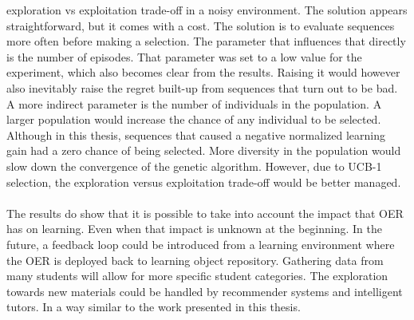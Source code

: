 exploration vs exploitation trade-off in a noisy environment. The solution
appears straightforward, but it comes with a cost. The solution is to evaluate
sequences more often before making a selection. The parameter that influences
that directly is the number of episodes. That parameter was set to a low value
for the experiment, which also becomes clear from the results. Raising it would
however also inevitably raise the regret built-up from sequences that turn out
to be bad. A more indirect parameter is the number of individuals in the
population. A larger population would increase the chance of any individual to
be selected. Although in this thesis, sequences that caused a negative normalized
learning gain had a zero chance of being selected. More diversity in the
population would slow down the convergence of the genetic algorithm. However,
due to UCB-1 selection, the exploration versus exploitation trade-off would be
better managed.\\\\
\noindent
The results do show that it is possible to take into account the impact that
OER has on learning. Even when that impact is unknown at the beginning. In the
future, a feedback loop could be introduced from a learning environment where
the OER is deployed back to learning object repository. Gathering data from
many students will allow for more specific student categories. The exploration
towards new materials could be handled by recommender systems and intelligent
tutors. In a way similar to the work presented in this thesis.
